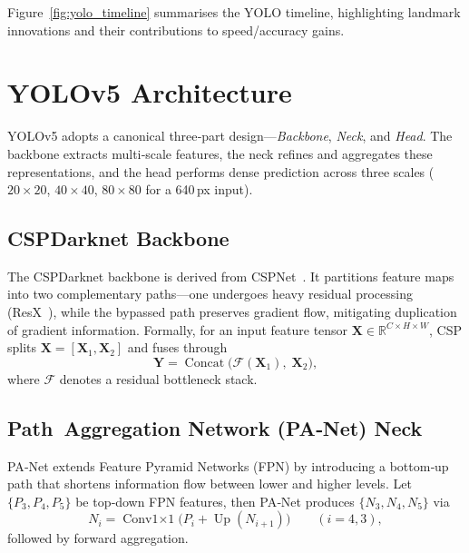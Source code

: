 \documentclass[12pt,a4paper]{article}
\begin{document}
Figure~\ref{fig:yolo_timeline} summarises the YOLO timeline, highlighting landmark innovations and their contributions to speed/accuracy gains.

\section{YOLOv5 Architecture}
\label{sec:architecture}

YOLOv5 adopts a canonical three‑part design—\emph{Backbone}, \emph{Neck}, and \emph{Head}. The backbone extracts multi‑scale features, the neck refines and aggregates these representations, and the head performs dense prediction across three scales (\(20\times20\), \(40\times40\), \(80\times80\) for a 640\,px input).

\subsection{CSPDarknet Backbone}
The CSPDarknet backbone is derived from CSPNet \cite{wang2020cspnet}. It partitions feature maps into two complementary paths—one undergoes heavy residual processing (ResX \cite{xie2017resnext}), while the bypassed path preserves gradient flow, mitigating duplication of gradient information. Formally, for an input feature tensor $\mathbf{X}\in\mathbb{R}^{C\times H\times W}$, CSP splits $\mathbf{X}=[\mathbf{X}_1,\mathbf{X}_2]$ and fuses through
\begin{equation}
  \mathbf{Y}=\operatorname{Concat}\bigl(\mathcal{F}(\mathbf{X}_1),\;\mathbf{X}_2\bigr),
\end{equation}
where $\mathcal{F}$ denotes a residual bottleneck stack.

\subsection{Path Aggregation Network (PA‑Net) Neck}
PA‑Net extends Feature Pyramid Networks (FPN) by introducing a bottom‑up path that shortens information flow between lower and higher levels. Let $\{P_3, P_4, P_5\}$ be top‑down FPN features, then PA‑Net produces $\{N_3,N_4,N_5\}$ via
\begin{equation}
  N_i = \operatorname{Conv1\times1}\bigl(P_i + \operatorname{Up}(N_{i+1})\bigr)\qquad (i=4,3),
\end{equation}
followed by forward aggregation.
\end{document}
